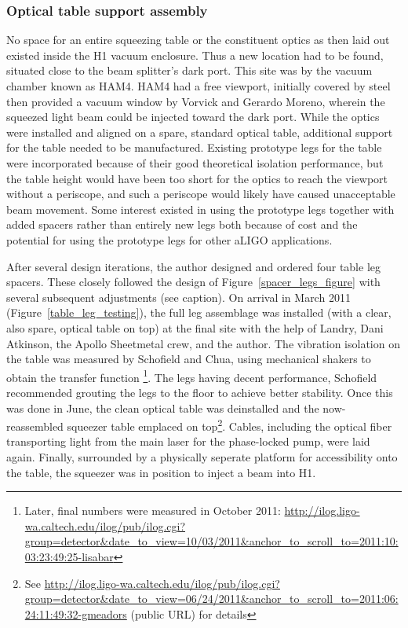 
            \subsubsection{Optical table support assembly}
            \label{table_legs}

No space for an entire squeezing table or the constituent optics as then laid out existed inside the H1 vacuum enclosure.
Thus a new location had to be found, situated close to the beam splitter's dark port.
This site was by the vacuum chamber known as HAM4.
HAM4 had a free viewport, initially covered by steel then provided a vacuum window by Vorvick and Gerardo Moreno, wherein the squeezed light beam could be injected toward the dark port.
While the optics were installed and aligned on a spare, standard optical table, additional support for the table needed to be manufactured.
Existing prototype legs for the table were incorporated because of their good theoretical isolation performance, but the table height would have been too short for the optics to reach the viewport without a periscope, and such a periscope would likely have caused unacceptable beam movement. 
Some interest existed in using the prototype legs together with added spacers rather than entirely new legs both because of cost and the potential for using the prototype legs for other aLIGO applications.

After several design iterations, the author designed and ordered four table leg spacers. These closely followed the design of Figure~\ref{spacer_legs_figure} with several subsequent adjustments (see caption).
On arrival in March 2011 (Figure~\ref{table_leg_testing}), the full leg assemblage was installed (with a clear, also spare, optical table on top) at the final site with the help of Landry, Dani Atkinson, the Apollo Sheetmetal crew, and the author.
The vibration isolation on the table was measured by Schofield and Chua, using mechanical shakers to obtain the transfer function \footnote{Later, final numbers were measured in October 2011: \url{http://ilog.ligo-wa.caltech.edu/ilog/pub/ilog.cgi?group=detector&date_to_view=10/03/2011&anchor_to_scroll_to=2011:10:03:23:49:25-lisabar}}.
The legs having decent performance, Schofield recommended grouting the legs to the floor to achieve better stability.
Once this was done in June, the clean optical table was deinstalled and the now-reassembled squeezer table emplaced on top\footnote{See \url{http://ilog.ligo-wa.caltech.edu/ilog/pub/ilog.cgi?group=detector&date_to_view=06/24/2011&anchor_to_scroll_to=2011:06:24:11:49:32-gmeadors} (public URL) for details}.
Cables, including the optical fiber transporting light from the main laser for the phase-locked pump, were laid again.
Finally, surrounded by a physically seperate platform for accessibility onto the table, the squeezer was in position to inject a beam into H1.


